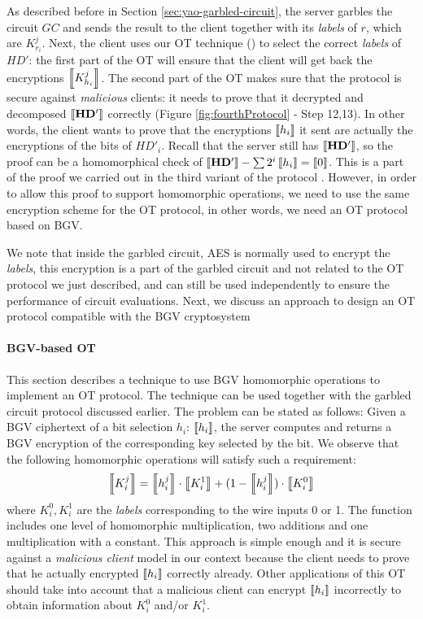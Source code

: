 As described before in Section \ref{sec:yao-garbled-circuit}, the server garbles
the circuit \(GC\) and sends the result to the client together with its \textit{labels} of
\(r\), which are \(K_{r_{i}}^{j}\). Next, the client uses our OT technique
(\missref{}) to select the correct \textit{labels} of \(HD'\): the first part of
the OT will ensure that the client will get back the encryptions
\(\left\llbracket K_{h_{i}}^{j}\right\rrbracket\). The second part of the OT makes sure that the protocol
is secure against \textit{malicious} clients: it needs to prove that it
decrypted and decomposed \(\left\llbracket\mathbf{HD'}\right\rrbracket\) correctly (Figure
\ref{fig:fourthProtocol} - Step 12,13). In other words, the client wants to
prove that the encryptions \(\left\llbracket h_{i}\right\rrbracket\) it sent are actually the
encryptions of the bits of \(HD'_{i}\). Recall that the server still has
\(\left\llbracket\mathbf{HD'}\right\rrbracket\), so the proof can be a homomorphical check of
\(\left\llbracket\mathbf{HD'}\right\rrbracket - \sum{2^{i}\left\llbracket h_{i}\right\rrbracket} = \left\llbracket0\right\rrbracket\). This is a part of
the proof we carried out in the third variant of the protocol \missref{}. However, in
order to allow this proof to support homomorphic operations, we need to use the
same encryption scheme for the OT protocol, in other words, we need an OT
protocol based on BGV.

We note that inside the garbled circuit, AES is normally used to encrypt the
\textit{labels}, this encryption is a part of the garbled circuit and not
related to the OT protocol we just described, and can still be used independently
to ensure the performance of circuit evaluations. Next, we discuss an approach
to design an OT protocol compatible with the BGV cryptosystem

\paragraph{BGV-based OT}

This section describes a technique to use BGV homomorphic operations to
implement an OT protocol. The technique can be used together with the garbled
circuit protocol discussed earlier. The problem can be stated as follows: Given
a BGV ciphertext of a bit selection \(h_{i}\): \(\left\llbracket h_{i}\right\rrbracket\), the server
computes and returns a BGV encryption of the corresponding key selected by the
bit. We observe that the following homomorphic operations will satisfy such a
requirement:
\[
\left\llbracket K_{i}^{j}\right\rrbracket = \left\llbracket h_{i}^{j}\right\rrbracket \cdot \left\llbracket K_{i}^{1}\right\rrbracket + (1 - \left\llbracket h_{i}^{j}\right\rrbracket) \cdot \left\llbracket K_{i}^{0}\right\rrbracket
\]
where \(K_{i}^{0}, K_{i}^{1}\) are the \textit{labels} corresponding to the wire
inputs 0 or 1. The function includes one level of homomorphic multiplication, two
additions and one multiplication with a constant. This approach is simple enough
and it is secure against a \textit{malicious client} model in our context because
the client needs to prove that he actually encrypted \(\left\llbracket h_{i}\right\rrbracket\)
correctly already. Other applications of this OT should take into account that a
malicious client can encrypt \(\left\llbracket h_{i}\right\rrbracket\) incorrectly to obtain information about
\(K_{i}^{0}\) and/or \(K_{i}^{1}\).

